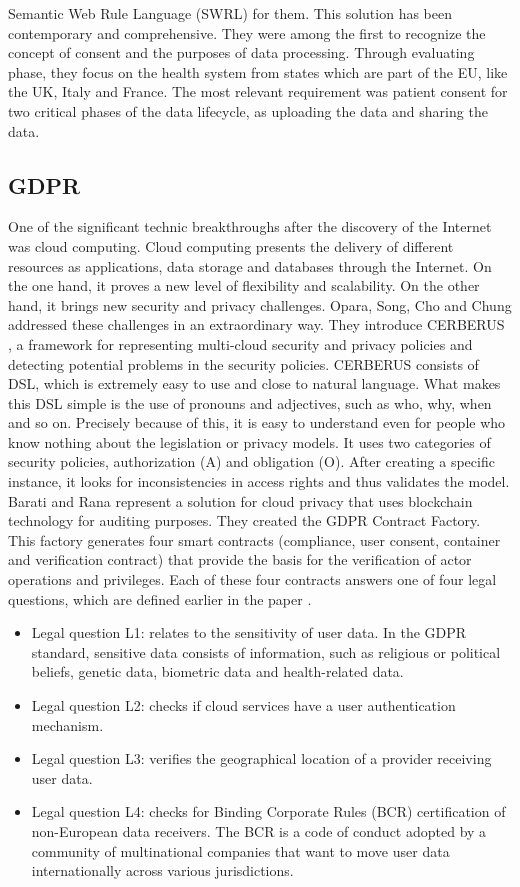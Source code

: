 \documentclass[11pt,english]{article}
\begin{document}
Semantic Web Rule Language (SWRL) \cite{swrl} for them. This solution has been contemporary and comprehensive. They were among the first to recognize the concept of consent and the purposes of data processing. Through evaluating phase, they focus on the health system from states which are part of the EU, like the UK, Italy and France. The most relevant requirement was patient consent for two critical phases of the data lifecycle, as uploading the data and sharing the data.
\subsection{GDPR}
One of the significant technic breakthroughs after the discovery of the Internet was cloud computing. Cloud computing presents the delivery of different resources as applications, data storage and databases through the Internet. On the one hand, it proves a new level of flexibility and scalability. On the other hand, it brings new security and privacy challenges. \newline Opara, Song, Cho and Chung addressed these challenges in an extraordinary way. They introduce CERBERUS \cite{opara2019representing}, a framework for representing multi-cloud security and privacy policies and detecting potential problems in the security policies. CERBERUS consists of DSL, which is extremely easy to use and close to natural language. What makes this DSL simple is the use of pronouns and adjectives, such as who, why, when and so on. Precisely because of this, it is easy to understand even for people who know nothing about the legislation or privacy models. It uses two categories of security policies, authorization (A) and obligation (O). After creating a specific instance, it looks for inconsistencies in access rights and thus validates the model. Barati and Rana \cite{barati2020tracking} represent a solution for cloud privacy that uses blockchain technology for auditing purposes. They created the GDPR Contract Factory. This factory generates four smart contracts (compliance, user consent, container and veriﬁcation contract) that provide the basis for the veriﬁcation of actor operations and privileges. Each of these four contracts answers one of four legal questions, which are defined earlier in the paper \cite{corrales2018smart}. 
\begin{itemize}
    \item Legal question L1: relates to the sensitivity of user data. In the GDPR standard, sensitive data consists of information, such as religious or political beliefs, genetic data, biometric data and health-related data.
    \item Legal question L2: checks if cloud services have a user
authentication mechanism.
    \item Legal question L3: veriﬁes the geographical location of a
provider receiving user data.
    \item Legal question L4: checks for Binding Corporate Rules
(BCR) certiﬁcation of non-European data receivers. The BCR is a code of conduct adopted by a community of multinational companies that want to move user data internationally across various jurisdictions.
\end{itemize}
\end{document}
